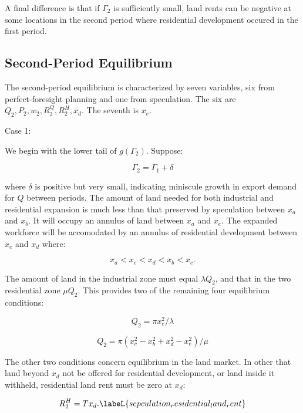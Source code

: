 A final difference is that if $\Gamma_2$ is sufficiently small, land rents can be negative at some locations in the second period where residential development occured in the first period.

\subsection{Second-Period Equilibrium}

The second-period equilibrium is characterized by seven variables, six from perfect-foresight planning and one from speculation. The six are $Q_2, P_2, w_2, R_2^Q, R_2^H, x_d$. The seventh is $x_e$. 

Case 1:

We begin with the lower tail of $g(\Gamma_2)$. Suppose:

\begin{equation*}
    \Gamma_2 = \Gamma_1 + \delta
\end{equation*}

where $\delta$ is positive but very small, indicating miniscule growth in export demand for $Q$ between periods. The amount of land needed for both industrial and residential expansion is much less than that preserved by speculation between $x_a$ and $x_b$. It will occupy an annulus of land between $x_a$ and $x_e$. The expanded workforce will be accomodated by an annulus of residential development between $x_e$ and $x_d$ where:

\begin{equation*}
    x_a < x_e < x_d < x_b < x_c.
\end{equation*}

The amount of land in the industrial zone must equal $\lambda Q_2$, and that in the two residential zone $\mu Q_2$. This provides two of the remaining four equilibrium conditions:

\begin{equation}
    Q_2 = \pi x_e^2 / \lambda
\end{equation}

\begin{equation}
    Q_2 = \pi(x_c^2 - x_b^2 + x_d^2 - x_e^2) / \mu
\end{equation}

The other two conditions concern equilibrium in the land market. In other that land beyond $x_d$ not be offered for residential development, or land inside it withheld, residential land rent must be zero at $x_d$:

\begin{equation}
    R_2^H = Tx_d. \labeL{sepculation_residential_land_rent}
\end{equation}

